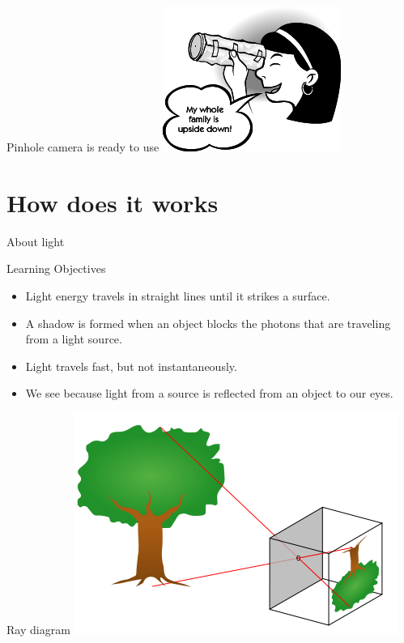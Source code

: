 \begin{frame}{Pinhole camera is ready to use}
  \centering
  \includegraphics{media/girl_looks.png}
\end{frame}

\section{How does it works}
\begin{frame}{About light}

Learning Objectives

\begin{itemize}
  \item 
    Light energy travels in straight lines until it strikes a surface.
  \item 
    A shadow is formed when an object blocks the photons that are traveling from a light source.
  \item 
    Light travels fast, but not instantaneously.
  \item 
    We see because light from a source is reflected from an object to our eyes.
\end{itemize}
\end{frame}

\begin{frame}{Ray diagram}
  \includegraphics[width=\textwidth]{media/pinhole.png}
\end{frame}

